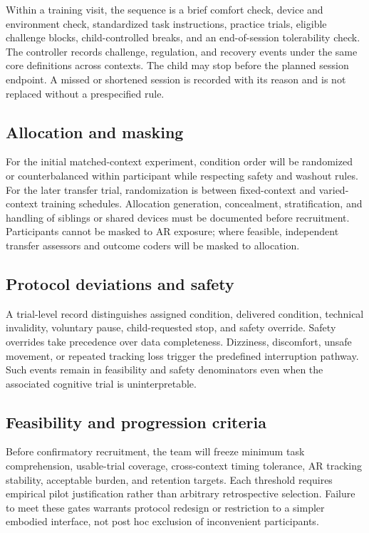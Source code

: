 Within a training visit, the sequence is a brief comfort check, device and environment check, standardized task instructions, practice trials, eligible challenge blocks, child-controlled breaks, and an end-of-session tolerability check. The controller records challenge, regulation, and recovery events under the same core definitions across contexts. The child may stop before the planned session endpoint. A missed or shortened session is recorded with its reason and is not replaced without a prespecified rule.

\subsection{Allocation and masking}
For the initial matched-context experiment, condition order will be randomized or counterbalanced within participant while respecting safety and washout rules. For the later transfer trial, randomization is between fixed-context and varied-context training schedules. Allocation generation, concealment, stratification, and handling of siblings or shared devices must be documented before recruitment. Participants cannot be masked to AR exposure; where feasible, independent transfer assessors and outcome coders will be masked to allocation.

\subsection{Protocol deviations and safety}
A trial-level record distinguishes assigned condition, delivered condition, technical invalidity, voluntary pause, child-requested stop, and safety override. Safety overrides take precedence over data completeness. Dizziness, discomfort, unsafe movement, or repeated tracking loss trigger the predefined interruption pathway. Such events remain in feasibility and safety denominators even when the associated cognitive trial is uninterpretable.

\subsection{Feasibility and progression criteria}
Before confirmatory recruitment, the team will freeze minimum task comprehension, usable-trial coverage, cross-context timing tolerance, AR tracking stability, acceptable burden, and retention targets. Each threshold requires empirical pilot justification rather than arbitrary retrospective selection. Failure to meet these gates warrants protocol redesign or restriction to a simpler embodied interface, not post hoc exclusion of inconvenient participants.

